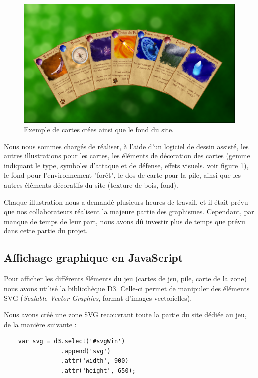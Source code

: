 \documentclass[12pt]{report}
\begin{document}
    \begin{figure}[h!]
     	\centering
       	\includegraphics[scale=0.45]{images/cards.png}
       	\caption{Exemple de cartes crées ainsi que le fond du site.}
       	\label{fig:cartes}
    \end{figure}

    Nous nous sommes chargés de réaliser, à l'aide d'un logiciel de dessin assisté, les autres illustrations pour les cartes, les éléments de décoration des cartes (gemme indiquant le type, symboles d'attaque et de défense, effets visuels. voir figure \ref{fig:cartes}), le fond pour l'environnement "forêt", le dos de carte pour la pile, ainsi que les autres éléments décoratifs du site (texture de bois, fond).

    Chaque illustration nous a demandé plusieurs heures de travail, et il était prévu que nos collaborateurs réalisent la majeure partie des graphismes. Cependant, par manque de temps de leur part, nous avons dû investir plus de temps que prévu dans cette partie du projet.

    \subsection{Affichage graphique en JavaScript}
		Pour afficher les différents éléments du jeu (cartes de jeu, pile, carte de la zone) nous avons utilisé la bibliothèque D3. Celle-ci permet de manipuler des éléments SVG (\textit{Scalable Vector Graphics}, format d'images vectorielles).

    Nous avons créé une zone SVG recouvrant toute la partie du site dédiée au jeu, de la manière suivante :

    \begin{verbatim}
    var svg = d3.select('#svgWin')
                .append('svg')
                .attr('width', 900)
                .attr('height', 650);
    \end{verbatim}
\end{document}
